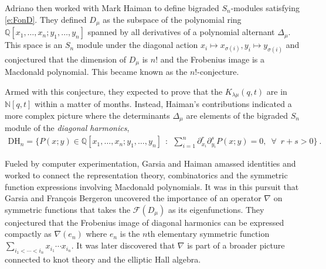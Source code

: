 \documentclass{amsart}
\begin{document}
Adriano then worked with Mark Haiman to
define bigraded $S_n$-modules satisfying \eqref{e:FonD}.
They defined $D_\mu$ as the subspace of the polynomial ring
${\mathbb Q}[x_1,\ldots ,x_n;y_1,\ldots,y_n]$ spanned by
all derivatives of a polynomial alternant $\Delta_\mu$.
This space is an $S_n$ module under the diagonal action
$x_i \mapsto x_{\sigma(i)}, y_i \mapsto y_{\sigma(i)}$
and conjectured that the dimension of $D_\mu$ is $n!$
and the Frobenius image is a Macdonald polynomial.
This became known as the $n!$-conjecture.


Armed with this conjecture, they expected to prove
that the $K_{\lambda\mu}(q,t)$ are in $\mathbb{N}[q,t]$
within a matter of months.
Instead, Haiman's contributions
indicated a more complex picture where
the determinants $\Delta_\mu$ are elements
of the bigraded
$S_n$ module of the {\it diagonal harmonics},
\begin{align*}
 \text{DH}_n=
 \big\{
 P(x;y)\in {\mathbb Q}[x_1,\ldots ,x_n;y_1,\ldots,y_n]
 ~~:~~
  \sum_{i=1}^n\partial_{x_i}^r\partial_{y_i}^s
 P(x;y)=0,\,\,\, \forall\,\,\,  r+s>0
 \big\}~.
\end{align*}

Fueled by computer experimentation, Garsia and Haiman amassed identities
and worked to connect the representation theory, combinatorics
and the symmetric function expressions involving Macdonald polynomials.
It was in this pursuit that Garsia and Fran\c{c}ois
Bergeron uncovered the importance of an operator
$\nabla$ on symmetric functions that takes the $\mathcal{F}(D_\mu)$
as its eigenfunctions.
They conjectured that the Frobenius image of diagonal harmonics
can be expressed compactly as
$\nabla(e_n)$ where $e_n$ is the $n$th elementary
symmetric function $\sum_{i_1<\cdots<i_n}x_{i_1}\cdots x_{i_n}$. It was later discovered that $\nabla$ is part of a broader picture connected to knot theory and
the elliptic Hall algebra.
\end{document}
